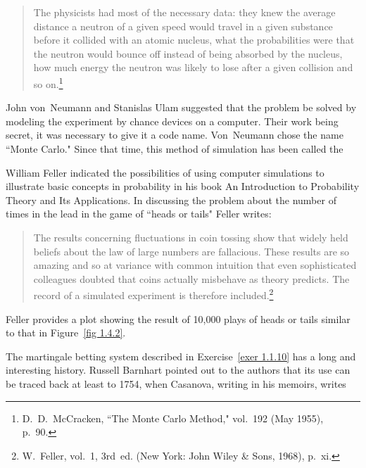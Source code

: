 \begin{quote}
The physicists had most of the necessary data: they knew the average
distance a neutron of a given speed would travel in a given substance before
it
collided with an atomic nucleus, what the probabilities were that the neutron
would bounce off instead of being absorbed by the nucleus, how much energy
the
neutron was likely to lose after a given collision and so on.\footnote{D.~D.~McCracken, ``The
Monte Carlo Method,"  vol.~192 (May 1955), p.~90.} 
\end{quote}

John von~Neumann and Stanislas Ulam 
suggested that the problem be solved by
modeling the experiment by chance devices on a computer.  Their work being
secret, it was necessary to give it a code name.  Von~Neumann chose the name
``Monte Carlo."  Since that time, this method of simulation has been called
the 

William Feller indicated the possibilities of using computer
simulations to illustrate basic concepts in probability in his book \emx
{An Introduction to Probability Theory and Its Applications.}  In discussing the
problem about the number of times in the lead in the game of ``heads or
tails" Feller writes:

\begin{quote} 
The results concerning fluctuations in coin tossing show that widely
held beliefs about the law of large numbers are fallacious.  These results
are
so amazing and so at variance with common intuition that even sophisticated
colleagues doubted that coins actually misbehave as theory predicts.  The
record of a simulated experiment is therefore included.\footnote{W.~Feller, 
 vol.~1,
3rd~ed. (New York: John Wiley \& Sons, 1968), p.~xi.}
\end{quote}

\noindent Feller provides a plot showing the result of 10{,}000 plays of \emx
{heads or tails} similar to that in Figure~\ref{fig 1.4.2}.

The martingale betting system 
described in Exercise~\ref{exer 1.1.10} 
has a long and interesting history.  Russell Barnhart pointed out to the
authors that its use can be traced back at least to 1754, when Casanova, 
writing in his memoirs,  writes

